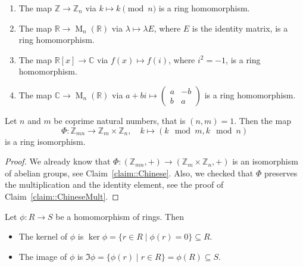 \begin{examples}
\begin{enumerate}
\item The map $\mathbb Z\to \mathbb Z_n$ via $k\mapsto k \pmod n$ is a ring homomorphism.

\item The map $\mathbb R\to \operatorname{M}_n(\mathbb R)$ via $\lambda \mapsto \lambda E$, where $E$ is the identity matrix, is a ring homomorphism.

\item The map $\mathbb R[x]\to \mathbb C$ via $f(x) \mapsto f(i)$, where $i^2 = -1$, is a ring homomorphism.

\item The map $\mathbb C\to \operatorname{M}_n(\mathbb R)$ via $a + bi \mapsto \left(\begin{smallmatrix}{a}&{-b}\\{b}&{a}\end{smallmatrix}\right)$ is a ring homomorphism.
\end{enumerate}
\end{examples}


\begin{claim}
Let $n$ and $m$ be coprime natural numbers, that is $(n,m) = 1$.
Then the map
\[
\Phi \colon \mathbb Z_{mn} \to \mathbb Z_m \times \mathbb Z_n,\quad k\mapsto (k\!\!\mod m, k\!\!\mod n)
\]
is a ring isomorphism.
\end{claim}
\begin{proof}
We already know that $\Phi\colon (\mathbb Z_{mn}, +) \to (\mathbb Z_m\times\mathbb Z_n, +)$ is an isomorphism of abelian groups, see Claim~\ref{claim::Chinese}.
Also, we checked that $\Phi$ preserves the multiplication and the identity element, see the proof of Claim~\ref{claim::ChineseMult}.
\end{proof}


\begin{definition}
Let $\phi\colon R\to S$ be a homomorphism of rings.
Then
\begin{itemize}
\item The kernel of $\phi$ is $\ker\phi = \{r\in R\mid \phi(r) = 0\}\subseteq R$.

\item The image of $\phi$ is $\Im \phi = \{\phi(r) \mid r\in R\} = \phi(R)\subseteq S$.
\end{itemize}
\end{definition}

